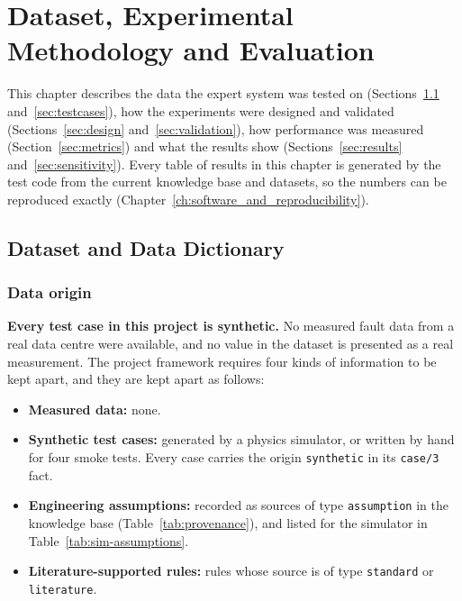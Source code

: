 \chapter{Dataset, Experimental Methodology and Evaluation}
\label{ch:dataset_and_evaluation}

This chapter describes the data the expert system was tested on (Sections~\ref{sec:dataset} and~\ref{sec:testcases}), how the experiments were designed and validated (Sections~\ref{sec:design} and~\ref{sec:validation}), how performance was measured (Section~\ref{sec:metrics}) and what the results show (Sections~\ref{sec:results} and~\ref{sec:sensitivity}). Every table of results in this chapter is generated by the test code from the current knowledge base and datasets, so the numbers can be reproduced exactly (Chapter~\ref{ch:software_and_reproducibility}).

\section{Dataset and Data Dictionary}
\label{sec:dataset}

\subsection{Data origin}

\textbf{Every test case in this project is synthetic.} No measured fault data from a real data centre were available, and no value in the dataset is presented as a real measurement. The project framework requires four kinds of information to be kept apart, and they are kept apart as follows:

\begin{itemize}
  \item \textbf{Measured data:} none.
  \item \textbf{Synthetic test cases:} generated by a physics simulator, or written by hand for four smoke tests. Every case carries the origin \texttt{synthetic} in its \texttt{case/3} fact.
  \item \textbf{Engineering assumptions:} recorded as sources of type \texttt{assumption} in the knowledge base (Table~\ref{tab:provenance}), and listed for the simulator in Table~\ref{tab:sim-assumptions}.
  \item \textbf{Literature-supported rules:} rules whose source is of type \texttt{standard} or \texttt{literature}.
\end{itemize}

